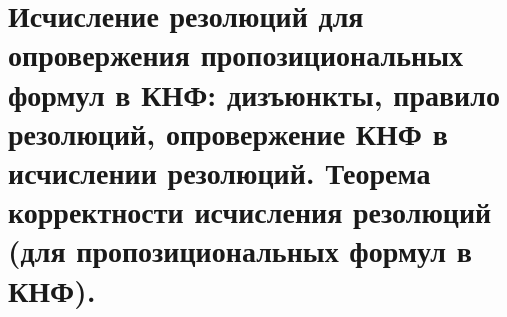 \section{Исчисление резолюций для опровержения пропозициональных формул в КНФ: дизъюнкты, правило резолюций, опровержение КНФ в исчислении резолюций. Теорема корректности исчисления резолюций (для пропозициональных формул в КНФ).}
